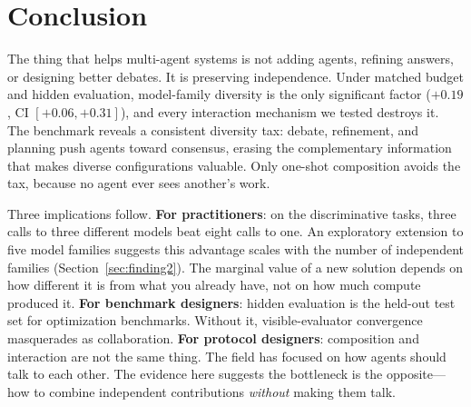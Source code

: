 \documentclass{article}
\begin{document}
\section{Conclusion}
\label{sec:conclusion}

The thing that helps multi-agent systems is not adding agents, refining answers, or designing better debates. It is preserving independence. Under matched budget and hidden evaluation, model-family diversity is the only significant factor ($+0.19$, CI $[+0.06, +0.31]$), and every interaction mechanism we tested destroys it. The benchmark reveals a consistent diversity tax: debate, refinement, and planning push agents toward consensus, erasing the complementary information that makes diverse configurations valuable. Only one-shot composition avoids the tax, because no agent ever sees another's work.

Three implications follow. \textbf{For practitioners}: on the discriminative tasks, three calls to three different models beat eight calls to one. An exploratory extension to five model families suggests this advantage scales with the number of independent families (Section~\ref{sec:finding2}). The marginal value of a new solution depends on how different it is from what you already have, not on how much compute produced it. \textbf{For benchmark designers}: hidden evaluation is the held-out test set for optimization benchmarks. Without it, visible-evaluator convergence masquerades as collaboration. \textbf{For protocol designers}: composition and interaction are not the same thing. The field has focused on how agents should talk to each other. The evidence here suggests the bottleneck is the opposite---how to combine independent contributions \emph{without} making them talk.

\end{document}
